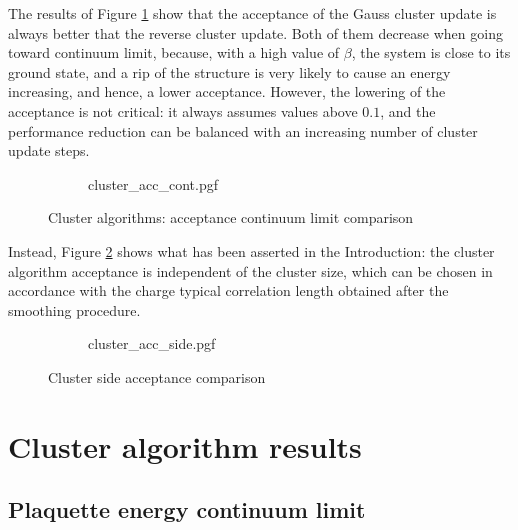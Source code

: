 The results of Figure \ref{fig:cluster_acc_cont} show that the acceptance of the Gauss cluster update is always better that the reverse cluster update.
Both of them decrease when going toward continuum limit, because, with a high value of $\beta$, the system is close to its ground state,
and a rip of the structure is very likely to cause an energy increasing, and hence, a lower acceptance.
However, the lowering of the acceptance is not critical: it always assumes values above $0.1$,
and the performance reduction can be balanced with an increasing number of cluster update steps.

\begin{figure}[!htb]
    \centering
    \begin{subfigure}{\textwidth}
        \centering
        {cluster_acc_cont.pgf}
    \end{subfigure}\vspace{2em}
    \begin{subfigure}{\textwidth}
        \centering
        
    \end{subfigure}
    \caption{Cluster algorithms: acceptance continuum limit comparison}
    \label{fig:cluster_acc_cont}
\end{figure}

Instead, Figure \ref{fig:cluster_acc_side} shows what has been asserted in the Introduction:
the cluster algorithm acceptance is independent of the cluster size,
which can be chosen in accordance with the charge typical correlation length obtained after the smoothing procedure.

\begin{figure}[!htb]
	\centering
    \begin{subfigure}{\textwidth}
        \centering
        {cluster_acc_side.pgf}
    \end{subfigure}\vspace{2em}
    \begin{subfigure}{\textwidth}
        \centering
        
    \end{subfigure}
    \caption{Cluster side acceptance comparison}
    \label{fig:cluster_acc_side}
\end{figure}

\section{Cluster algorithm results}

\subsection*{Plaquette energy continuum limit}


